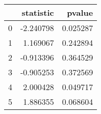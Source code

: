 \begin{tabular}{lrr}
\toprule
{} &  statistic &    pvalue \\
\midrule
0 &  -2.240798 &  0.025287 \\
1 &   1.169067 &  0.242894 \\
2 &  -0.913396 &  0.364529 \\
3 &  -0.905253 &  0.372569 \\
4 &   2.000428 &  0.049717 \\
5 &   1.886355 &  0.068604 \\
\bottomrule
\end{tabular}
